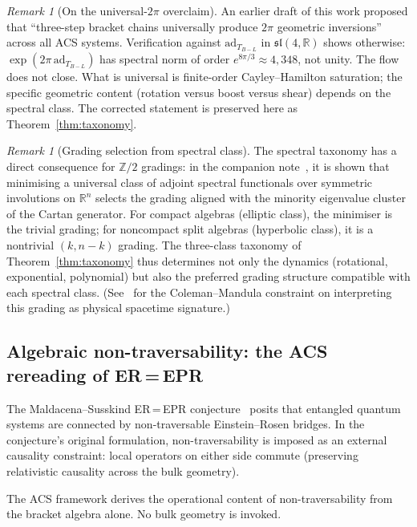 \documentclass[11pt,a4paper]{article}
\theoremstyle{plain}
\theoremstyle{definition}
\theoremstyle{remark}
\newtheorem{remark}[theorem]{Remark}
\begin{document}
\begin{remark}[On the universal-$2\pi$ overclaim]
An earlier draft of this work proposed that ``three-step bracket
chains universally produce $2\pi$ geometric inversions'' across all
ACS systems.  Verification against $\mathrm{ad}_{T_{B-L}}$ in
$\mathfrak{sl}(4,\mathbb{R})$ shows otherwise:
$\exp(2\pi\,\mathrm{ad}_{T_{B-L}})$ has spectral norm of order
$e^{8\pi/3} \approx 4{,}348$, not unity.  The flow does not close.
What is universal is finite-order Cayley--Hamilton saturation; the
specific geometric content (rotation versus boost versus shear)
depends on the spectral class.  The corrected statement is preserved
here as Theorem~\ref{thm:taxonomy}.
\end{remark}

\begin{remark}[Grading selection from spectral class]
The spectral taxonomy has a direct consequence for $\mathbb{Z}/2$
gradings: in the companion note~\cite{WallaceN2}, it is shown that
minimising a universal class of adjoint spectral functionals over
symmetric involutions on $\mathbb{R}^n$ selects the grading
aligned with the minority eigenvalue cluster of the Cartan
generator.  For compact algebras (elliptic class), the minimiser is
the trivial grading; for noncompact split algebras (hyperbolic
class), it is a nontrivial $(k, n{-}k)$ grading.  The three-class
taxonomy of Theorem~\ref{thm:taxonomy} thus determines not only
the dynamics (rotational, exponential, polynomial) but also the
preferred grading structure compatible with each spectral class.
(See~\cite{WallaceN2} for the Coleman--Mandula constraint on
interpreting this grading as physical spacetime signature.)
\end{remark}

\subsection{Algebraic non-traversability: the ACS rereading of ER\,=\,EPR}
\label{sec:erepr}

The Maldacena--Susskind ER\,=\,EPR conjecture~\cite{MaldacenaSusskind2013}
posits that entangled quantum systems are connected by non-traversable
Einstein--Rosen bridges.  In the conjecture's original formulation,
non-traversability is imposed as an external causality constraint:
local operators on either side commute (preserving relativistic causality
across the bulk geometry).

The ACS framework derives the operational content of non-traversability
from the bracket algebra alone.  No bulk geometry is invoked.
\end{document}
